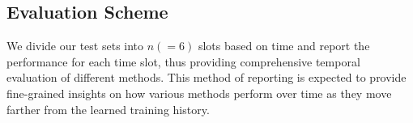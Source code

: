 \documentclass[11pt]{article}
\begin{document}
\begin{table}[t!]
\caption{Comparison of DyRep with state-of-art approaches}
{}
\label{tab:compare}
\vspace{-3mm}
\end{table}

\subsection{Evaluation Scheme}
We divide our test sets into $n (=6)$ slots based on time and report the performance for each time slot, thus providing comprehensive temporal evaluation of different methods. This method of reporting is expected to provide fine-grained insights on how various methods perform over time as they move farther from the learned training history. 
\end{document}
